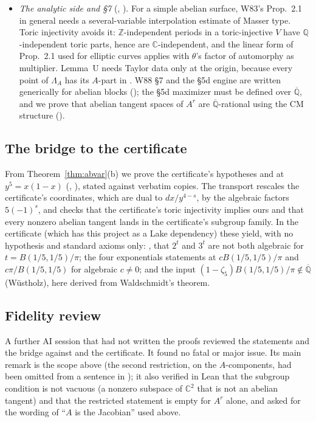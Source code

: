 \documentclass[11pt]{amsart}
\theoremstyle{definition}
\theoremstyle{remark}
\numberwithin{equation}{section}
\newcommand{\ZZ}{\mathbb{Z}}
\newcommand{\QQ}{\mathbb{Q}}
\newcommand{\CC}{\mathbb{C}}
\newcommand{\Qbar}{\overline{\mathbb{Q}}}
\begin{document}
\begin{itemize}
certificates. The interface is semantic: identities that the elliptic proof checked formally modulo the
cone become consequences of the laws on the image, which avoids an estimated twenty- to forty-fold increase
of the certificate work. The Jacobian is the instance .
\item \emph{The analytic side and \S7} (, ). For a simple abelian
surface, W83's Prop.~2.1 in general needs a several-variable interpolation estimate of Masser type. Toric
injectivity avoids it: $\ZZ$-independent periods in a toric-injective $V$ have $\QQ$-independent toric parts,
hence are $\CC$-independent, and the linear form of Prop.~2.1 used for elliptic curves applies with
$\theta$'s factor of automorphy as multiplier. Lemma~U needs Taylor data only at the origin, because every
point of $\Lambda_A$ has its $A$-part in . W88 \S7 and the \S5d engine are written generically
for abelian blocks (); the \S5d maximizer must be defined over $\Qbar$, and we prove that
abelian tangent spaces of $A^r$ are $\Qbar$-rational using the CM structure ().
\end{itemize}

\subsection{The bridge to the certificate}
From Theorem~\ref{thm:abvar}(b) we prove the certificate's hypotheses  and
 at $y^5=x(1-x)$ (, ), stated against
verbatim copies. The transport rescales the certificate's coordinates, which are dual to $dx/y^{4-s}$, by
the algebraic factors $5(-1)^s$, and checks that the certificate's toric injectivity implies ours and that
every nonzero abelian tangent lands in the certificate's subgroup family. In the certificate (which has this
project as a Lake dependency) these yield, with no hypothesis and standard axioms only:
, that $2^{t}$ and $3^{t}$ are not both algebraic for $t=B(1/5,1/5)/\pi$; the
four exponentials statements at $cB(1/5,1/5)/\pi$ and $c\pi/B(1/5,1/5)$ for algebraic $c\ne0$; and the input
$(1-\zeta_5)B(1/5,1/5)/\pi\notin\Qbar$ (Wüstholz), here derived from Waldschmidt's theorem.

\subsection{Fidelity review}
A further AI session that had not written the proofs reviewed the statements and the bridge against
\cite[pp.~375, 385--386, 394--395]{W88} and the certificate. It found no fatal or major issue. Its main remark is
the scope above (the second restriction, on the $A$-components, had been omitted from a sentence in
\cite{MstarPaper}); it also verified in Lean that the subgroup condition is not vacuous (a nonzero
subspace of $\CC^2$ that is not an abelian tangent) and that the restricted statement is empty for $A^r$
alone, and asked for the wording of ``$A$ is the Jacobian'' used above.
\end{document}
